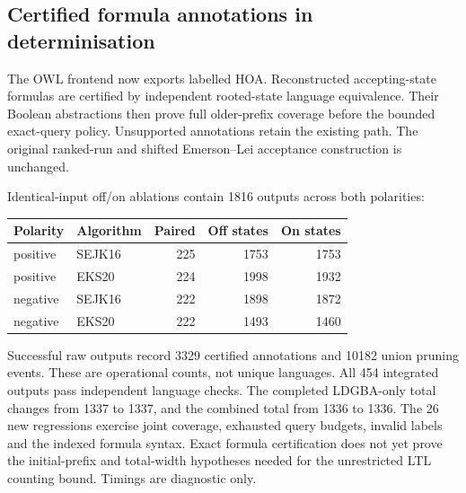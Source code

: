 \subsection{Certified formula annotations in determinisation}
The OWL frontend now exports labelled HOA. Reconstructed accepting-state
formulas are certified by independent rooted-state language equivalence.
Their Boolean abstractions then prove full older-prefix coverage before
the bounded exact-query policy. Unsupported annotations retain the existing path.
The original ranked-run and shifted Emerson--Lei acceptance construction is unchanged.

Identical-input off/on ablations contain 1816 outputs across both polarities:
\begin{center}\begin{tabular}{llrrr}
Polarity & Algorithm & Paired & Off states & On states\\\hline
positive & SEJK16 & 225 & 1753 & 1753\\
positive & EKS20 & 224 & 1998 & 1932\\
negative & SEJK16 & 222 & 1898 & 1872\\
negative & EKS20 & 222 & 1493 & 1460\\
\end{tabular}\end{center}
Successful raw outputs record 3329 certified annotations and 10182 union pruning events. These are operational counts, not unique languages.
All 454 integrated outputs pass independent language checks. The completed
LDGBA-only total changes from 1337 to 1337,
and the combined total from 1336 to 1336.
The 26 new regressions exercise joint coverage, exhausted query budgets,
invalid labels and the indexed formula syntax. Exact formula certification
does not yet prove the initial-prefix and total-width hypotheses needed for
the unrestricted LTL counting bound. Timings are diagnostic only.
